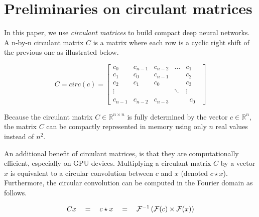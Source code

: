 \documentclass[runningheads]{llncs}
\newcommand{\F}{{\ensuremath \mathcal F}}
\begin{document}
\section{Preliminaries on circulant matrices}
\label{sec:circ}

In this paper, we use {\em circulant matrices} to build compact deep neural networks. A n-by-n circulant matrix $C$ is a matrix where each row is a cyclic right shift of the previous one as illustrated below.

\[
C = circ(c) =\left[\begin{array}{ccccc}
c_{0} & c_{n-1} & c_{n-2} & \dots & c_{1} \\
c_{1} & c_{0} & c_{n-1} & & c_{2} \\
c_{2} & c_{1} & c_{0}& & c_{3} \\
\vdots & & & \ddots & \vdots \\
c_{n-1} & c_{n-2} & c_{n-3} & & \phantom{0}c_{0}\phantom{0}
\end{array}\right]
\]

Because the circulant matrix $C \in \mathbb R^{n\times n}$ is fully determined by the vector $c \in \mathbb R^n$, the matrix $C$ can be compactly represented in memory using only $n$ real values instead of $n^2$.

An additional benefit of circulant matrices, is that they are computationally efficient, especially on GPU devices. Multiplying a circulant matrix $C$ by a vector $x$ is equivalent to a circular convolution between $c$ and $x$ (denoted $c \star x$). Furthermore, the circular convolution can be computed in the Fourier domain as follows. 

\begin{equation*}
  Cx \quad = \quad c \star x \quad = \quad \F^{-1}\left(\F(c) \times \F(x)\right)
\end{equation*}
\end{document}
